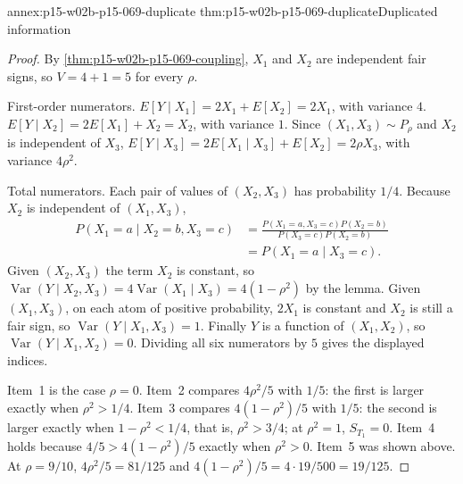 \begin{annexitem}{annex:p15-w02b-p15-069-duplicate}
 {thm:p15-w02b-p15-069-duplicate}{Duplicated information}
\begin{proof}
By \cref{thm:p15-w02b-p15-069-coupling}, \(X_1\) and \(X_2\) are
independent fair signs, so \(V=4+1=5\) for every \(\rho\).

First-order numerators. \(E[Y\mid X_1]=2X_1+E[X_2]=2X_1\), with variance
\(4\). \(E[Y\mid X_2]=2E[X_1]+X_2=X_2\), with variance \(1\). Since
\((X_1,X_3)\sim P_\rho\) and \(X_2\) is independent of \(X_3\),
\(E[Y\mid X_3]=2E[X_1\mid X_3]+E[X_2]=2\rho X_3\), with variance
\(4\rho^2\).

Total numerators. Each pair of values of \((X_2,X_3)\) has probability
\(1/4\). Because \(X_2\) is independent of \((X_1,X_3)\),
\[
\begin{split}
 P(X_1=a\mid X_2=b,X_3=c)
 &=\frac{P(X_1=a,X_3=c)P(X_2=b)}{P(X_3=c)P(X_2=b)}\\
 &=P(X_1=a\mid X_3=c).
\end{split}
\]
Given \((X_2,X_3)\) the term \(X_2\) is constant, so
\(\operatorname{Var}(Y\mid X_2,X_3)=4\operatorname{Var}(X_1\mid X_3)
 =4(1-\rho^2)\) by the lemma. Given \((X_1,X_3)\), on each atom of
positive probability, \(2X_1\) is constant and \(X_2\) is still a fair
sign, so \(\operatorname{Var}(Y\mid X_1,X_3)=1\). Finally \(Y\) is a
function of \((X_1,X_2)\), so \(\operatorname{Var}(Y\mid X_1,X_2)=0\).
Dividing all six numerators by \(5\) gives the displayed indices.

Item~1 is the case \(\rho=0\). Item~2 compares \(4\rho^2/5\) with
\(1/5\): the first is larger exactly when \(\rho^2>1/4\). Item~3 compares
\(4(1-\rho^2)/5\) with \(1/5\): the second is larger exactly when
\(1-\rho^2<1/4\), that is, \(\rho^2>3/4\); at \(\rho^2=1\),
\(S_{T_1}=0\). Item~4 holds because \(4/5>4(1-\rho^2)/5\) exactly when
\(\rho^2>0\). Item~5 was shown above. At \(\rho=9/10\),
\(4\rho^2/5=81/125\) and \(4(1-\rho^2)/5=4\cdot19/500=19/125\).
\end{proof}
\end{annexitem}

